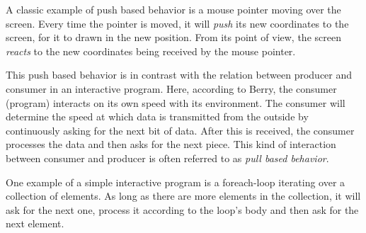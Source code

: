 A classic example of push based behavior is a mouse pointer moving over the screen. Every time the pointer is moved, it will \emph{push} its new coordinates to the screen, for it to drawn in the new position. From its point of view, the screen \emph{reacts} to the new coordinates being received by the mouse pointer.

This push based behavior is in contrast with the relation between producer and consumer in an interactive program. Here, according to Berry, the consumer (program) interacts on its own speed with its environment. The consumer will determine the speed at which data is transmitted from the outside by continuously asking for the next bit of data. After this is received, the consumer processes the data and then asks for the next piece. This kind of interaction between consumer and producer is often referred to as \textit{pull based behavior}.

One example of a simple interactive program is a foreach-loop iterating over a collection of elements. As long as there are more elements in the collection, it will ask for the next one, process it according to the loop's body and then ask for the next element.
